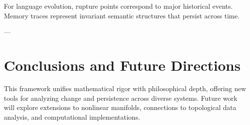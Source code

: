 \documentclass[12pt]{article}
\theoremstyle{plain}
\theoremstyle{definition}
\begin{document}
For language evolution, rupture points correspond to major historical events. Memory traces represent invariant semantic structures that persist across time.

---

\section{Conclusions and Future Directions}

This framework unifies mathematical rigor with philosophical depth, offering new tools for analyzing change and persistence across diverse systems. Future work will explore extensions to nonlinear manifolds, connections to topological data analysis, and computational implementations.
\end{document}
